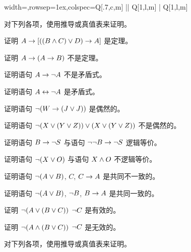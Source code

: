 \else


\begin{table}\small
\begin{tblr}[expand=\tmptable]{width=\textwidth,rowsep=1ex,colspec={Q[.7,c,m] || Q[1,l,m] | Q[1,l,m]}}
\tmptable
\end{tblr}
\caption{何时提供真值表，何时提供证明。}
\label{table.ProofOrModel}
\end{table}


\fi

\practiceproblems
\noindent\problempart 对下列各项，使用推导或真值表来证明。


\begin{compactlist}%
\item 证明 $A \rightarrow [((B \wedge C) \vee D) \rightarrow A]$ 是定理。
\item 证明 $A \rightarrow (A \rightarrow B)$ 不是定理。
\item 证明语句 $A \rightarrow \neg{A}$ 不是矛盾式。
\item 证明语句 $A \leftrightarrow \neg A$ 是矛盾式。
\item 证明语句 $ \neg (W \rightarrow (J \vee J)) $ 是偶然的。
\item 证明语句 $ \neg(X \vee (Y \vee Z)) \vee (X \vee (Y \vee Z))$ 不是偶然的。
 \item 证明语句 $B \rightarrow \neg S$ 与语句 $\neg \neg B \rightarrow \neg S$ 逻辑等价。
\item 证明语句 $ \neg (X \vee O) $ 与语句 $X \wedge O$ 不逻辑等价。
\item 证明语句 $\neg(A \vee B)$, $C$, $C \rightarrow A$ 是共同不一致的。
\item 证明语句 $\neg(A \vee B)$, $\neg{B}$, $B \rightarrow A$ 是共同一致的。
\item 证明 $\neg(A \vee (B \vee C)) $ \therefore $ \neg{C}$ 是有效的。
\item 证明 $\neg(A \wedge (B \vee C))$ \therefore $ \neg{C}$ 是无效的。
\end{compactlist}

\noindent\problempart 对下列各项，使用推导或真值表来证明。

